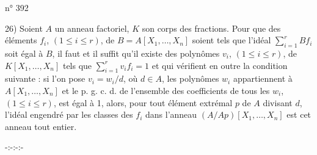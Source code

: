 \hfill n° 392

26) Soient $A$ un anneau factoriel, $K$ son corps des fractions. Pour que des éléments $f_i$, $(1\leq i\leq r)$, de $B=A[X_1,\ldots,X_n]$ soient tels que l'idéal $\sum_{i=1}^{r}Bf_i$ soit égal à $B$, il faut et il suffit qu'il existe des polynômes $v_i$, $(1\leq i\leq r)$, de $K[X_1,\ldots,X_n]$ tels que $\sum_{i=1}^{r}v_i f_i=1$ et qui vérifient en outre la condition suivante : si l'on pose $v_i=w_i/d$, où $d\in A$, les polynômes $w_i$ appartiennent à $A[X_1,\ldots,X_n]$ et le p. g. c. d. de l'ensemble des coefficients de tous les $w_i$, $(1\leq i\leq r)$, est égal à 1, alors, pour tout élément extrémal $p$ de $A$ divisant $d$, l'idéal engendré par les classes des $f_i$ dans l'anneau $(A/Ap)[X_1,\ldots,X_n]$ est cet anneau tout entier.

\begin{center}
-:-:-:-
\end{center}

